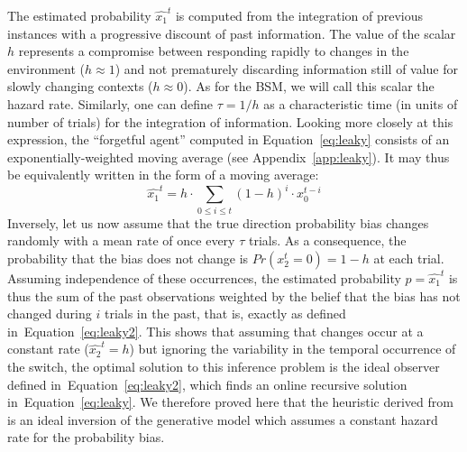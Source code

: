 \documentclass[12pt,english]{article}%
\newcommand{\eql}[1]{\begin{equation}#1\end{equation}}
\newcommand{\citet}[1]{\textcite{#1}}
\newcommand{\seeEq}[1]{Equation~\ref{eq:#1}}
\newcommand{\seeApp}[1]{Appendix~\ref{app:#1}}
\newcommand{\AM}[1]{\textbf{\textcolor{blue}{[AM: #1]}}}
\begin{document}
The estimated probability $\hat{x_1}^{t}$ is computed
from the integration of previous instances
with a progressive discount of past information.
The value of the scalar $h$ represents
a compromise between responding rapidly
to changes in the environment ($h \approx 1$) and
not prematurely discarding information still of value
for slowly changing contexts  ($h \approx 0$).
As for the BSM, we will call this scalar the hazard rate.
Similarly, one can define $\tau = 1 / h$ as
a characteristic time (in units of number of trials)
for the integration of information.
Looking more closely at this expression,
the ``forgetful agent'' computed in \seeEq{leaky}
consists of an exponentially-weighted moving average (see \seeApp{leaky}).
It may thus be equivalently written in the form of a moving average:
\eql{
\hat{x_1}^{t} = h \cdot \sum_{0\leq i \leq t} (1 - h)^{i} \cdot x_0^{t-i}
\label{eq:leaky2}}
Inversely, let us now assume that
the true direction probability bias changes randomly with a mean rate of once
every $\tau$ trials.
As a consequence, the probability that the bias does not change is $Pr(x_2^t=0)=1-h$ at each trial.
Assuming independence of these occurrences, the estimated probability $p=\hat{x_1}^{t}$ is thus the sum
of the past observations weighted by the belief that the bias has not changed during $i$ trials in the past, that is, exactly as defined in~\seeEq{leaky2}.
This shows that
assuming that changes occur at a constant rate ($\hat{x_2}^t=h$)
but ignoring the variability in the temporal occurrence of the switch,
the optimal solution to this inference problem is the
ideal observer defined in~\seeEq{leaky2},
which finds an online recursive solution in~\seeEq{leaky}.
We therefore proved here that the heuristic derived from~\citet{Anderson2006}
is an ideal inversion of the generative model
which assumes a constant hazard rate for the probability bias.
\end{document}
